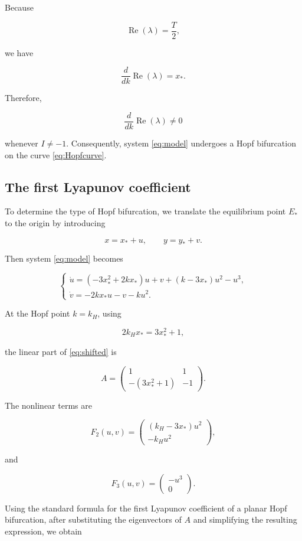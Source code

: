 \documentclass[11pt,reqno]{amsart}
\theoremstyle{plain}
\theoremstyle{definition}
\theoremstyle{remark}
\begin{document}
Because

\[
\operatorname{Re}(\lambda)=\frac{T}{2},
\]

we have

\[
\frac{d}{dk}\operatorname{Re}(\lambda)
=
x_*.
\]

Therefore,

\[
\frac{d}{dk}\operatorname{Re}(\lambda)
\neq0
\]

whenever $I\neq-1$. Consequently, system \eqref{eq:model}
undergoes a Hopf bifurcation on the curve \eqref{eq:Hopfcurve}.


\subsection{The first Lyapunov coefficient}

To determine the type of Hopf bifurcation, we translate the equilibrium
point $E_*$ to the origin by introducing

\[
x=x_*+u,\qquad y=y_*+v .
\]

Then system \eqref{eq:model} becomes

\begin{equation}
\label{eq:shifted}
\begin{cases}
\dot{u}=(-3x_*^2+2kx_*)u+v
 +(k-3x_*)u^2-u^3,\\[1mm]
\dot{v}=-2kx_*u-v-ku^2 .
\end{cases}
\end{equation}

At the Hopf point $k=k_H$, using

\[
2k_Hx_*=3x_*^2+1,
\]

the linear part of \eqref{eq:shifted} is

\[
A=
\begin{pmatrix}
1&1\\
-(3x_*^2+1)&-1
\end{pmatrix}.
\]

The nonlinear terms are

\[
F_2(u,v)=
\begin{pmatrix}
(k_H-3x_*)u^2\\
-k_Hu^2
\end{pmatrix},
\]

and

\[
F_3(u,v)=
\begin{pmatrix}
-u^3\\
0
\end{pmatrix}.
\]

Using the standard formula for the first Lyapunov coefficient of a
planar Hopf bifurcation, after substituting the eigenvectors of $A$ and
simplifying the resulting expression, we obtain
\end{document}
